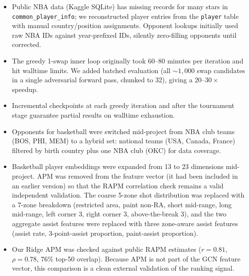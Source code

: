 \documentclass[12pt,letterpaper]{article}
\begin{document}
\begin{itemize}[leftmargin=*]
  \item Public NBA data (Kaggle SQLite) has missing records for many
    stars in \texttt{common\_player\_info}; we reconstructed player
    entries from the \texttt{player} table with manual country/position
    assignments.
    Opponent lookups initially used raw NBA IDs against year-prefixed
    IDs, silently zero-filling opponents until corrected.
  \item The greedy 1-swap inner loop originally took 60--80 minutes
    per iteration and hit walltime limits.
    We added batched evaluation (all ${\sim}1{,}000$ swap candidates in
    a single adversarial forward pass, chunked to 32), giving a
    $20$--$30\times$ speedup.
  \item Incremental checkpoints at each greedy iteration and after the
    tournament stage guarantee partial results on walltime exhaustion.
  \item Opponents for basketball were switched mid-project from NBA
    club teams (BOS, PHI, MEM) to a hybrid set: national teams (USA,
    Canada, France) filtered by birth country plus one NBA club (OKC)
    for data coverage.
  \item Basketball player embeddings were expanded from 13 to 23
    dimensions mid-project.
    APM was removed from the feature vector (it had been included in an
    earlier version) so that the RAPM correlation check remains a valid
    independent validation.
    The coarse 5-zone shot distribution was replaced with a 7-zone
    breakdown (restricted area, paint non-RA, short mid-range, long
    mid-range, left corner 3, right corner 3, above-the-break 3), and
    the two aggregate assist features were replaced with three
    zone-aware assist features (assist rate, 3-point-assist proportion,
    paint-assist proportion).
  \item Our Ridge APM was checked against public RAPM estimates
    ($r = 0.81$, $\rho = 0.78$, 76\% top-50 overlap).
    Because APM is not part of the GCN feature vector, this comparison
    is a clean external validation of the ranking signal.
\end{itemize}
\end{document}
